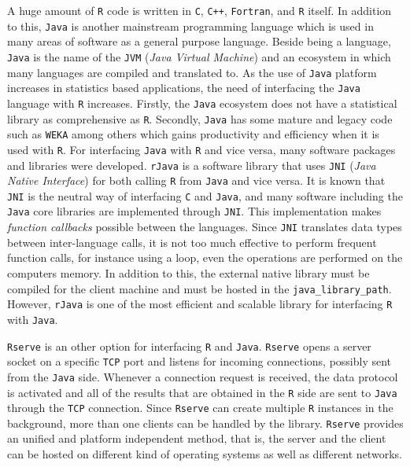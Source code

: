 \documentclass[10pt,a4paper, final, oneside]{article}
\begin{document}
A huge amount of \texttt{R} code is written in \texttt{C}, \texttt{C++}, \texttt{Fortran}, and \texttt{R} itself. In addition to this, \texttt{Java} is another mainstream programming language which is used in many areas of software as a general purpose language. Beside being a language, \texttt{Java} is the name of the \texttt{JVM} (\emph{Java Virtual Machine}) and an ecosystem in which many languages are compiled and translated to. As the use of \texttt{Java} platform increases in statistics based applications, the need of interfacing the \texttt{Java} language with \texttt{R} increases. Firstly, the \texttt{Java} ecosystem does not have a statistical library as comprehensive as \texttt{R}. Secondly, \texttt{Java} has some mature and legacy code such as \texttt{WEKA} \cite{hall2009weka,RWeka1,RWeka2} among others which gains productivity and efficiency when it is used with \texttt{R}. For interfacing \texttt{Java} with \texttt{R} and vice versa, many software packages and libraries were developed. \texttt{rJava} \cite{urbanek2009talk,rJava} is a software library that uses \texttt{JNI} \cite{gordon1998essential} (\emph{Java Native Interface}) for both calling \texttt{R} from \texttt{Java} and vice versa. It is known that \texttt{JNI} is the neutral way of interfacing \texttt{C} and \texttt{Java}, and many software including the \texttt{Java} core libraries are implemented through \texttt{JNI}. This implementation makes \emph{function callbacks} possible between the languages. Since \texttt{JNI} translates data types between inter-language calls, it is not too much effective to perform frequent function calls, for instance using a loop, even the operations are performed on the computers memory. In addition to this, the external native library must be compiled for the client machine and must be hosted in the \texttt{java\_library\_path}. However, \texttt{rJava} is one of the most efficient and scalable library for interfacing \texttt{R} with \texttt{Java}. 

\texttt{Rserve} \cite{urbanek2003fast} is an other option for interfacing \texttt{R} and \texttt{Java}. \texttt{Rserve} opens a server socket on a specific \texttt{TCP} port and listens for incoming connections, possibly sent from the \texttt{Java} side. Whenever a connection request is received, the data protocol is activated and all of the results that are obtained in the \texttt{R} side are sent to \texttt{Java} through the \texttt{TCP} connection. Since \texttt{Rserve} can create multiple \texttt{R} instances in the background, more than one clients can be handled by the library. \texttt{Rserve} provides an unified and platform independent method, that is, the server and the client can be hosted on different kind of operating systems as well as different networks. 
\end{document}
